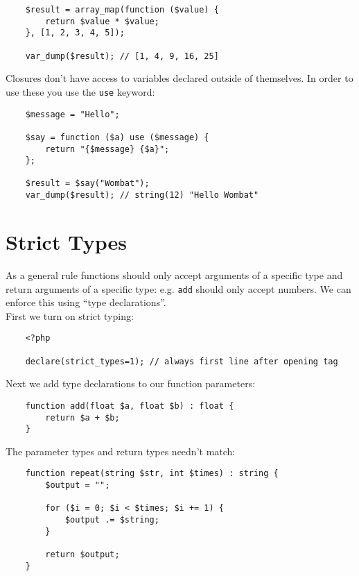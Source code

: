 \begin{verbatim}
    $result = array_map(function ($value) {
        return $value * $value;
    }, [1, 2, 3, 4, 5]);

    var_dump($result); // [1, 4, 9, 16, 25]
\end{verbatim}

Closures don't have access to variables declared outside of themselves. In order to use these you use the \texttt{use} keyword:

\begin{verbatim}
    $message = "Hello";

    $say = function ($a) use ($message) {
        return "{$message} {$a}";
    };

    $result = $say("Wombat");
    var_dump($result); // string(12) "Hello Wombat"
\end{verbatim}


\section{Strict Types}

As a general rule functions should only accept arguments of a specific type and return arguments of a specific type: e.g. \texttt{add} should only accept numbers. We can enforce this using ``type declarations''.
\\

First we turn on strict typing:

\begin{verbatim}
    <?php

    declare(strict_types=1); // always first line after opening tag
\end{verbatim}

Next we add type declarations to our function parameters:

\begin{verbatim}
    function add(float $a, float $b) : float {
        return $a + $b;
    }
\end{verbatim}

The parameter types and return types needn't match:

\begin{verbatim}
    function repeat(string $str, int $times) : string {
        $output = "";

        for ($i = 0; $i < $times; $i += 1) {
            $output .= $string;
        }

        return $output;
    }
\end{verbatim}


